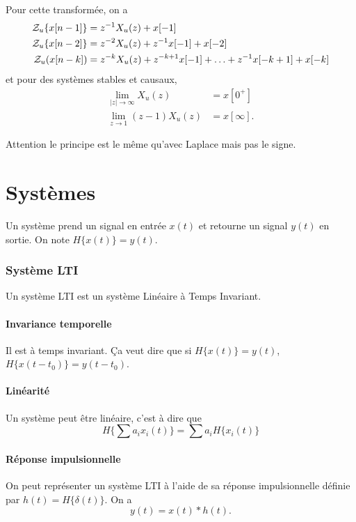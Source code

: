 Pour cette transformée, on a
\begin{align*}
  \mathcal{Z}_u\{x[n-1]\} & =
  z^{-1}X_u(z) + x[-1]\\
  \mathcal{Z}_u\{x[n-2]\} & =
  z^{-2}X_u(z) + z^{-1}x[-1] + x[-2]\\
  \mathcal{Z}_u(x[n-k]) & =
  z^{-k}X_u(z) + z^{-k+1}x[-1] + \ldots + z^{-1}x[-k+1] + x[-k]
\end{align*}
et pour des systèmes stables et causaux,
\begin{align*}
  \lim_{|z|\to\infty} X_u(z) & = x[0^+]\\
  \lim_{z\to 1} (z-1)X_u(z) & = x[\infty].
\end{align*}

Attention le principe est le même qu'avec Laplace mais pas le signe.




\part{Systèmes}
Un système prend un signal en entrée $x(t)$ et retourne un signal $y(t)$
en sortie.
On note $H\{x(t)\} = y(t)$.

\section{Système LTI}
Un système LTI est un système Linéaire à Temps Invariant.

\subsection{Invariance temporelle}
Il est à temps invariant.
Ça veut dire que si $H\{x(t)\} = y(t)$, $H\{x(t-t_0)\} = y(t-t_0)$.

\subsection{Linéarité}
Un système peut être linéaire, c'est à dire que
\[ H\{\sum a_ix_i(t)\} = \sum a_iH\{x_i(t)\} \]

\subsection{Réponse impulsionnelle}
On peut représenter un système LTI à l'aide de sa réponse impulsionnelle
définie par $h(t) = H\{\delta(t)\}$. On a
\[ y(t) = x(t) * h(t). \]

